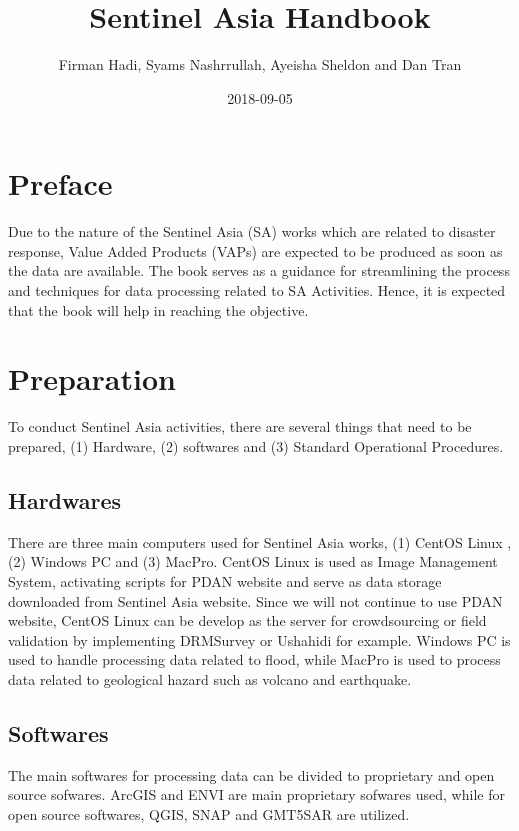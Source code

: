 \documentclass[]{book}
\title{Sentinel Asia Handbook}
\author{Firman Hadi, Syams Nashrrullah, Ayeisha Sheldon and Dan Tran}
\date{2018-09-05}
\theoremstyle{definition}
\theoremstyle{definition}
\theoremstyle{definition}
\theoremstyle{remark}
\begin{document}
\maketitle

{
\setcounter{tocdepth}{1}
\tableofcontents
}
\chapter*{Preface}\label{preface}

Due to the nature of the Sentinel Asia (SA) works which are related to
disaster response, Value Added Products (VAPs) are expected to be
produced as soon as the data are available. The book serves as a
guidance for streamlining the process and techniques for data processing
related to SA Activities. Hence, it is expected that the book will help
in reaching the objective.

\chapter{Preparation}\label{preparation}

To conduct Sentinel Asia activities, there are several things that need
to be prepared, (1) Hardware, (2) softwares and (3) Standard Operational
Procedures.

\section{Hardwares}\label{hardwares}

There are three main computers used for Sentinel Asia works, (1) CentOS
Linux , (2) Windows PC and (3) MacPro. CentOS Linux is used as Image
Management System, activating scripts for PDAN website and serve as data
storage downloaded from Sentinel Asia website. Since we will not
continue to use PDAN website, CentOS Linux can be develop as the server
for crowdsourcing or field validation by implementing DRMSurvey or
Ushahidi for example. Windows PC is used to handle processing data
related to flood, while MacPro is used to process data related to
geological hazard such as volcano and earthquake.

\section{Softwares}\label{softwares}

The main softwares for processing data can be divided to proprietary and
open source sofwares. ArcGIS and ENVI are main proprietary sofwares
used, while for open source softwares, QGIS, SNAP and GMT5SAR are
utilized.
\end{document}
